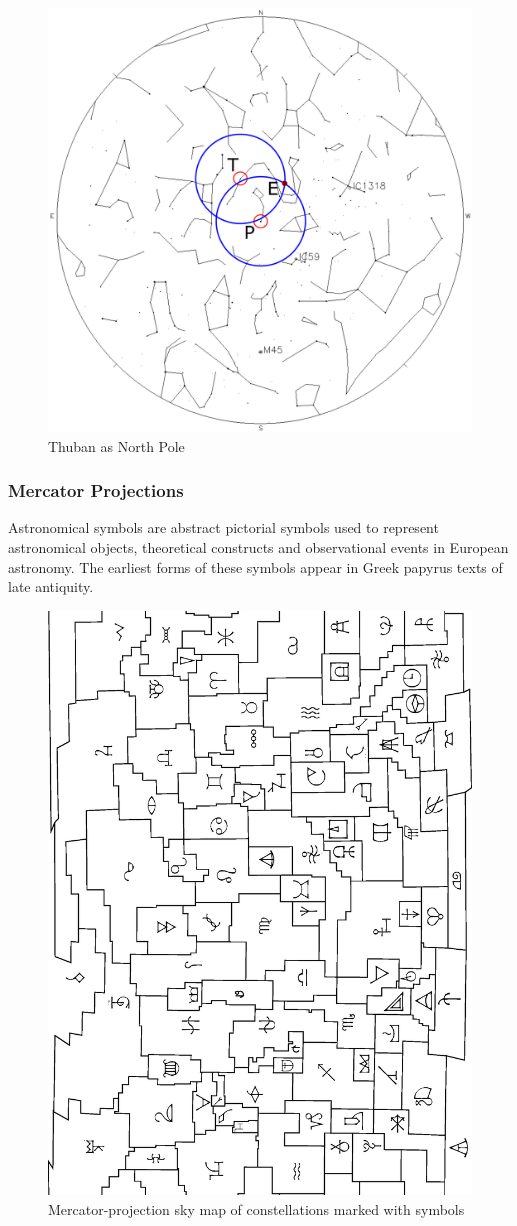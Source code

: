 \documentclass[a4paper,12pt]{extarticle}
\begin{document}
\begin{figure}[H]
	\centering
	\includegraphics[width=0.8\linewidth]{thuban.png}
	\caption{Thuban as North Pole}
	\label{precession}
\end{figure}
\clearpage 
\subsubsection{Mercator Projections}
Astronomical symbols are abstract pictorial symbols used to represent astronomical objects, theoretical constructs and observational events in European astronomy. The earliest forms of these symbols appear in Greek papyrus texts of late antiquity.
\begin{figure}[H]
	\centering
	\includegraphics[width=0.8\linewidth]{starmap-glyph.png}
	\caption{Mercator-projection sky map of constellations marked with symbols}
\end{figure}
\end{document}
